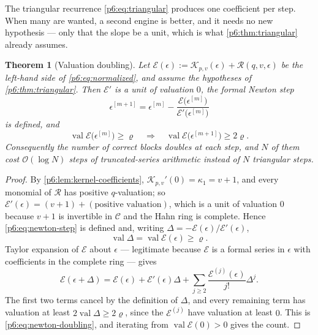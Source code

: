 \documentclass[11pt,a4paper,oneside]{book}
\theoremstyle{plain}
\newtheorem{theorem}{Theorem}[chapter]
\theoremstyle{definition}
\theoremstyle{remark}
\newcommand{\bigO}{\mathcal{O}}
\begin{document}
The triangular recurrence \eqref{p6:eq:triangular} produces one coefficient
per step.  When many are wanted, a second engine is better, and it needs no
new hypothesis --- only that the slope be a unit, which is what
\cref{p6:thm:triangular} already assumes.

\begin{theorem}[Valuation doubling]\label{p6:thm:newton}
Let $\mathcal{E}(\epsilon):=\mathcal{K}_{p,v}(\epsilon)+\mathcal{R}(q,v,\epsilon)$
be the left-hand side of \eqref{p6:eq:normalized}, and assume the hypotheses of
\cref{p6:thm:triangular}.  Then $\mathcal{E}'$ is a unit of valuation $0$, the
formal Newton step
\begin{equation}\label{p6:eq:newton-step}
 \epsilon^{[m+1]}=\epsilon^{[m]}
 -\frac{\mathcal{E}\bigl(\epsilon^{[m]}\bigr)}
        {\mathcal{E}'\bigl(\epsilon^{[m]}\bigr)}
\end{equation}
is defined, and
\begin{equation}\label{p6:eq:newton-doubling}
 \operatorname{val}\mathcal{E}\bigl(\epsilon^{[m]}\bigr)\ge\varrho
 \quad\Longrightarrow\quad
 \operatorname{val}\mathcal{E}\bigl(\epsilon^{[m+1]}\bigr)\ge2\varrho .
\end{equation}
Consequently the number of correct blocks doubles at each step, and $N$ of them
cost $\bigO(\log N)$ steps of truncated-series arithmetic instead of $N$
triangular steps.
\end{theorem}

\begin{proof}
By \cref{p6:lem:kernel-coefficients}, $\mathcal{K}_{p,v}'(0)=\kappa_1=v+1$,
and every monomial of $\mathcal{R}$ has positive $q$-valuation; so
$\mathcal{E}'(\epsilon)=(v+1)+(\text{positive valuation})$, which is a unit of
valuation $0$ because $v+1$ is invertible in $\mathscr C$ and the Hahn ring is
complete.  Hence \eqref{p6:eq:newton-step} is defined and, writing
$\Delta=-\mathcal{E}(\epsilon)/\mathcal{E}'(\epsilon)$,
\[
 \operatorname{val}\Delta=\operatorname{val}\mathcal{E}(\epsilon)\ge\varrho .
\]
Taylor expansion of $\mathcal{E}$ about $\epsilon$ --- legitimate because
$\mathcal{E}$ is a formal series in $\epsilon$ with coefficients in the
complete ring --- gives
\[
 \mathcal{E}(\epsilon+\Delta)
 =\mathcal{E}(\epsilon)+\mathcal{E}'(\epsilon)\Delta
 +\sum_{j\ge2}\frac{\mathcal{E}^{(j)}(\epsilon)}{j!}\Delta^{j} .
\]
The first two terms cancel by the definition of $\Delta$, and every remaining
term has valuation at least $2\operatorname{val}\Delta\ge2\varrho$, since the
$\mathcal{E}^{(j)}$ have valuation at least $0$.  This is
\eqref{p6:eq:newton-doubling}, and iterating from
$\operatorname{val}\mathcal{E}(0)>0$ gives the count.
\end{proof}
\end{document}
